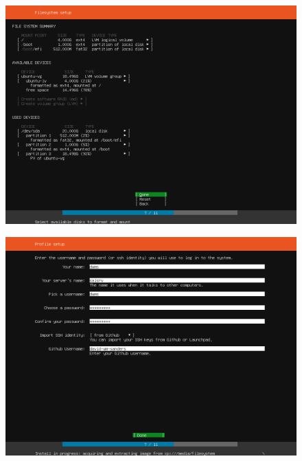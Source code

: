 \begin{figure}[h!]
\centering
\captionsetup{skip=\skipfigurecaptionlen}
\includegraphics[width=1\textwidth]{screenshots/IY2D502-2019-02-21-19-16-43.png}
\caption{}
\label{fig:IY2D502-2019-02-21-19-16-43}
\end{figure}
\pagebreak
\begin{figure}[h!]
\centering
\captionsetup{skip=\skipfigurecaptionlen}
\includegraphics[width=1\textwidth]{screenshots/IY2D502-2019-02-21-19-17-27.png}
\caption{}
\label{fig:IY2D502-2019-02-21-19-17-27}
\end{figure}
\pagebreak
